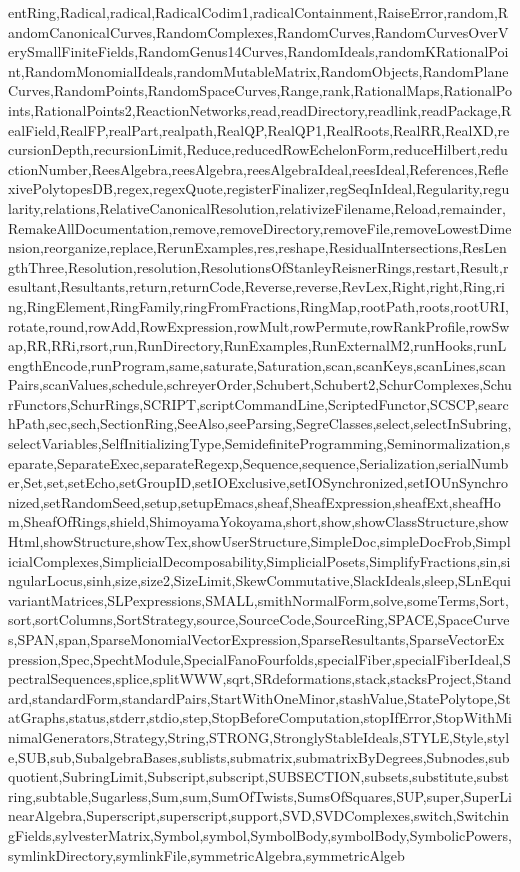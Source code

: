 {entRing,Radical,radical,RadicalCodim1,radicalContainment,RaiseError,random,RandomCanonicalCurves,RandomComplexes,RandomCurves,RandomCurvesOverVerySmallFiniteFields,RandomGenus14Curves,RandomIdeals,randomKRationalPoint,RandomMonomialIdeals,randomMutableMatrix,RandomObjects,RandomPlaneCurves,RandomPoints,RandomSpaceCurves,Range,rank,RationalMaps,RationalPoints,RationalPoints2,ReactionNetworks,read,readDirectory,readlink,readPackage,RealField,RealFP,realPart,realpath,RealQP,RealQP1,RealRoots,RealRR,RealXD,recursionDepth,recursionLimit,Reduce,reducedRowEchelonForm,reduceHilbert,reductionNumber,ReesAlgebra,reesAlgebra,reesAlgebraIdeal,reesIdeal,References,ReflexivePolytopesDB,regex,regexQuote,registerFinalizer,regSeqInIdeal,Regularity,regularity,relations,RelativeCanonicalResolution,relativizeFilename,Reload,remainder,RemakeAllDocumentation,remove,removeDirectory,removeFile,removeLowestDimension,reorganize,replace,RerunExamples,res,reshape,ResidualIntersections,ResLengthThree,Resolution,resolution,ResolutionsOfStanleyReisnerRings,restart,Result,resultant,Resultants,return,returnCode,Reverse,reverse,RevLex,Right,right,Ring,ring,RingElement,RingFamily,ringFromFractions,RingMap,rootPath,roots,rootURI,rotate,round,rowAdd,RowExpression,rowMult,rowPermute,rowRankProfile,rowSwap,RR,RRi,rsort,run,RunDirectory,RunExamples,RunExternalM2,runHooks,runLengthEncode,runProgram,same,saturate,Saturation,scan,scanKeys,scanLines,scanPairs,scanValues,schedule,schreyerOrder,Schubert,Schubert2,SchurComplexes,SchurFunctors,SchurRings,SCRIPT,scriptCommandLine,ScriptedFunctor,SCSCP,searchPath,sec,sech,SectionRing,SeeAlso,seeParsing,SegreClasses,select,selectInSubring,selectVariables,SelfInitializingType,SemidefiniteProgramming,Seminormalization,separate,SeparateExec,separateRegexp,Sequence,sequence,Serialization,serialNumber,Set,set,setEcho,setGroupID,setIOExclusive,setIOSynchronized,setIOUnSynchronized,setRandomSeed,setup,setupEmacs,sheaf,SheafExpression,sheafExt,sheafHom,SheafOfRings,shield,ShimoyamaYokoyama,short,show,showClassStructure,showHtml,showStructure,showTex,showUserStructure,SimpleDoc,simpleDocFrob,SimplicialComplexes,SimplicialDecomposability,SimplicialPosets,SimplifyFractions,sin,singularLocus,sinh,size,size2,SizeLimit,SkewCommutative,SlackIdeals,sleep,SLnEquivariantMatrices,SLPexpressions,SMALL,smithNormalForm,solve,someTerms,Sort,sort,sortColumns,SortStrategy,source,SourceCode,SourceRing,SPACE,SpaceCurves,SPAN,span,SparseMonomialVectorExpression,SparseResultants,SparseVectorExpression,Spec,SpechtModule,SpecialFanoFourfolds,specialFiber,specialFiberIdeal,SpectralSequences,splice,splitWWW,sqrt,SRdeformations,stack,stacksProject,Standard,standardForm,standardPairs,StartWithOneMinor,stashValue,StatePolytope,StatGraphs,status,stderr,stdio,step,StopBeforeComputation,stopIfError,StopWithMinimalGenerators,Strategy,String,STRONG,StronglyStableIdeals,STYLE,Style,style,SUB,sub,SubalgebraBases,sublists,submatrix,submatrixByDegrees,Subnodes,subquotient,SubringLimit,Subscript,subscript,SUBSECTION,subsets,substitute,substring,subtable,Sugarless,Sum,sum,SumOfTwists,SumsOfSquares,SUP,super,SuperLinearAlgebra,Superscript,superscript,support,SVD,SVDComplexes,switch,SwitchingFields,sylvesterMatrix,Symbol,symbol,SymbolBody,symbolBody,SymbolicPowers,symlinkDirectory,symlinkFile,symmetricAlgebra,symmetricAlgeb}
